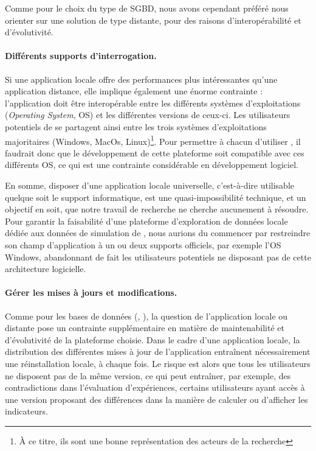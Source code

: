 Comme pour le choix du type de SGBD, nous avons cependant préféré nous orienter sur une solution de type distante, pour des raisons d'interopérabilité et d'évolutivité.


\paragraph{Différents supports d'interrogation.}
Si une application locale offre des performances plus intéressantes qu'une application distance, elle implique également une énorme contrainte : l'application doit être interopérable entre les différents systèmes d'exploitations (\textit{Operating System}, OS) et les différentes versions de ceux-ci.
Les utilisateurs potentiels de \simedb{} se partagent ainsi entre les trois systèmes d'exploitations majoritaires (Windows, MacOs, Linux)\footnote{
	À ce titre, ils sont une bonne représentation des acteurs de la recherche
}.
Pour permettre à chacun d'utiliser \simedb{}, il faudrait donc que le développement de cette plateforme soit compatible avec ces différents OS, ce qui est une contrainte considérable en développement logiciel.

En somme, disposer d'une application locale universelle, c'est-à-dire utilisable quelque soit le support informatique, est une quasi-impossibilité technique, et un objectif en soit, que notre travail de recherche ne cherche aucunement à résoudre.
Pour garantir la faisabilité d'une plateforme d'exploration de données locale dédiée aux données de simulation de \simfeodal{}, nous aurions du commencer par restreindre son champ d'application à un ou deux supports officiels, par exemple l'OS Windows, abandonnant de fait les utilisateurs potentiels ne disposant pas de cette architecture logicielle.

\paragraph{Gérer les mises à jours et modifications.}

Comme pour les bases de données (\og {}\fg{}, ), la question de l'application locale ou distante pose un contrainte supplémentaire en matière de maintenabilité et d'évolutivité de la plateforme choisie.
Dans le cadre d'une application locale, la distribution des différentes mises à jour de l'application entraînent nécessairement une réinstallation locale, à chaque fois.
Le risque est alors que tous les utilisateurs ne disposent pas de la même version, ce qui peut entraîner, par exemple, des contradictions dans l'évaluation d'expériences, certains utilisateurs ayant accès à une version proposant des différences dans la manière de calculer ou d'afficher les indicateurs.

